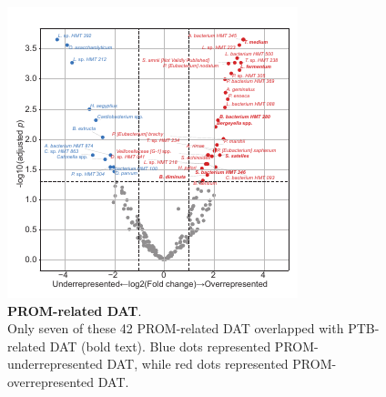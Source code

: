 \documentclass[11pt, a4paper, onecolumn, oneside]{report}
\begin{document}
            \begin{figure}[p]
                \centering
                \includegraphics[width=\linewidth]{Figures/PTB/FigS2-PROM.pdf}
                \caption[PROM-related DAT]{\textbf{PROM-related DAT}. \\
                    Only seven of these 42 PROM-related DAT overlapped with PTB-related DAT (bold text). Blue dots represented PROM-underrepresented DAT, while red dots represented PROM-overrepresented DAT.}
                \label{fig:PTB-volcano}
            \end{figure}
            \clearpage
\end{document}
